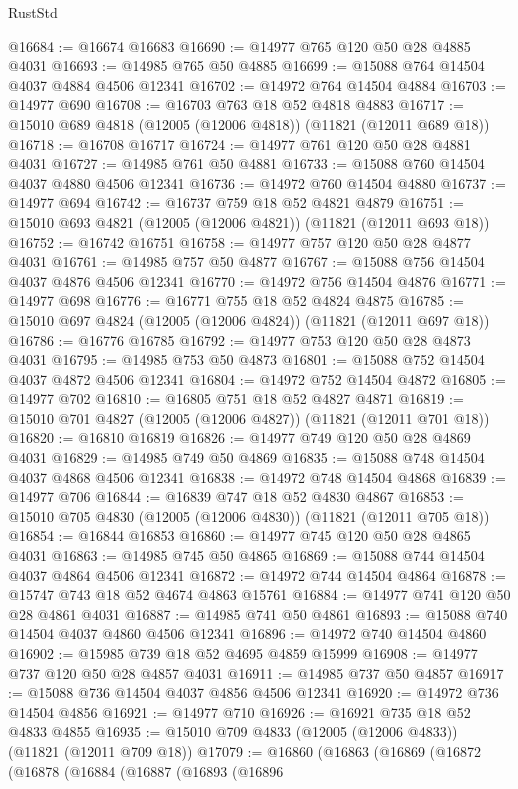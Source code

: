 \begin{lexlean}{RustStd}
\begin{coremodule}
@16684 := @16674 @16683
@16690 := @14977 @765 @120 @50 @28 @4885 @4031
@16693 := @14985 @765 @50 @4885
@16699 := @15088 @764 @14504 @4037 @4884 @4506 @12341
@16702 := @14972 @764 @14504 @4884
@16703 := @14977 @690
@16708 := @16703 @763 @18 @52 @4818 @4883
@16717 := @15010 @689 @4818 (@12005 (@12006 @4818)) (@11821 (@12011 @689 @18))
@16718 := @16708 @16717
@16724 := @14977 @761 @120 @50 @28 @4881 @4031
@16727 := @14985 @761 @50 @4881
@16733 := @15088 @760 @14504 @4037 @4880 @4506 @12341
@16736 := @14972 @760 @14504 @4880
@16737 := @14977 @694
@16742 := @16737 @759 @18 @52 @4821 @4879
@16751 := @15010 @693 @4821 (@12005 (@12006 @4821)) (@11821 (@12011 @693 @18))
@16752 := @16742 @16751
@16758 := @14977 @757 @120 @50 @28 @4877 @4031
@16761 := @14985 @757 @50 @4877
@16767 := @15088 @756 @14504 @4037 @4876 @4506 @12341
@16770 := @14972 @756 @14504 @4876
@16771 := @14977 @698
@16776 := @16771 @755 @18 @52 @4824 @4875
@16785 := @15010 @697 @4824 (@12005 (@12006 @4824)) (@11821 (@12011 @697 @18))
@16786 := @16776 @16785
@16792 := @14977 @753 @120 @50 @28 @4873 @4031
@16795 := @14985 @753 @50 @4873
@16801 := @15088 @752 @14504 @4037 @4872 @4506 @12341
@16804 := @14972 @752 @14504 @4872
@16805 := @14977 @702
@16810 := @16805 @751 @18 @52 @4827 @4871
@16819 := @15010 @701 @4827 (@12005 (@12006 @4827)) (@11821 (@12011 @701 @18))
@16820 := @16810 @16819
@16826 := @14977 @749 @120 @50 @28 @4869 @4031
@16829 := @14985 @749 @50 @4869
@16835 := @15088 @748 @14504 @4037 @4868 @4506 @12341
@16838 := @14972 @748 @14504 @4868
@16839 := @14977 @706
@16844 := @16839 @747 @18 @52 @4830 @4867
@16853 := @15010 @705 @4830 (@12005 (@12006 @4830)) (@11821 (@12011 @705 @18))
@16854 := @16844 @16853
@16860 := @14977 @745 @120 @50 @28 @4865 @4031
@16863 := @14985 @745 @50 @4865
@16869 := @15088 @744 @14504 @4037 @4864 @4506 @12341
@16872 := @14972 @744 @14504 @4864
@16878 := @15747 @743 @18 @52 @4674 @4863 @15761
@16884 := @14977 @741 @120 @50 @28 @4861 @4031
@16887 := @14985 @741 @50 @4861
@16893 := @15088 @740 @14504 @4037 @4860 @4506 @12341
@16896 := @14972 @740 @14504 @4860
@16902 := @15985 @739 @18 @52 @4695 @4859 @15999
@16908 := @14977 @737 @120 @50 @28 @4857 @4031
@16911 := @14985 @737 @50 @4857
@16917 := @15088 @736 @14504 @4037 @4856 @4506 @12341
@16920 := @14972 @736 @14504 @4856
@16921 := @14977 @710
@16926 := @16921 @735 @18 @52 @4833 @4855
@16935 := @15010 @709 @4833 (@12005 (@12006 @4833)) (@11821 (@12011 @709 @18))
@17079 := @16860
    (@16863
      (@16869
        (@16872
          (@16878
            (@16884
              (@16887
                (@16893
                  (@16896

\end{coremodule}
\end{lexlean}
